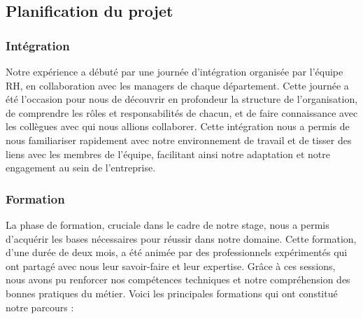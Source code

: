 \subsection{Planification du projet}

\subsubsection{Intégration}

Notre expérience a débuté par une journée d'intégration organisée par l'équipe RH, en collaboration avec les managers de chaque département. Cette journée a été l'occasion pour nous de découvrir en profondeur la structure de l'organisation, de comprendre les rôles et responsabilités de chacun, et de faire connaissance avec les collègues avec qui nous allions collaborer. Cette intégration nous a permis de nous familiariser rapidement avec notre environnement de travail et de tisser des liens avec les membres de l'équipe, facilitant ainsi notre adaptation et notre engagement au sein de l'entreprise.

\subsubsection{Formation}

La phase de formation, cruciale dans le cadre de notre stage, nous a permis d'acquérir les bases nécessaires pour réussir dans notre domaine. Cette formation, d'une durée de deux mois, a été animée par des professionnels expérimentés qui ont partagé avec nous leur savoir-faire et leur expertise. Grâce à ces sessions, nous avons pu renforcer nos compétences techniques et notre compréhension des bonnes pratiques du métier. Voici les principales formations qui ont constitué notre parcours :

